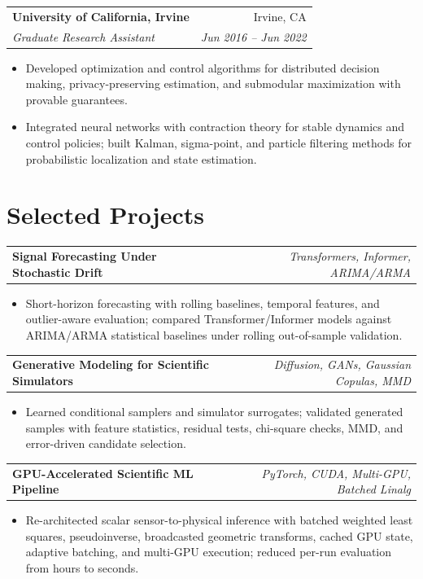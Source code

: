 \documentclass[10pt,letterpaper]{article}
\makeatletter
\newcommand{\resumeSubheading}[4]{
  \vspace{-1pt}
  \begin{tabular*}{\textwidth}[t]{l@{\extracolsep{\fill}}r}
    \textbf{#1} & #2 \\
    \textit{\small #3} & \textit{\small #4} \\
  \end{tabular*}\vspace{-5pt}
}
\newcommand{\resumeProjectHeading}[2]{
  \vspace{-1pt}
  \begin{tabular*}{\textwidth}[t]{l@{\extracolsep{\fill}}r}
    \textbf{\small #1} & \textit{\small #2} \\
  \end{tabular*}\vspace{-5pt}
}
\newcommand{\resumeItem}[1]{\item\small{#1}\vspace{-2pt}}
\makeatother
\begin{document}
\resumeSubheading{University of California, Irvine}{Irvine, CA}{Graduate Research Assistant}{Jun 2016 -- Jun 2022}
\begin{itemize}[leftmargin=0.15in, itemsep=-2pt, parsep=2pt]
  \resumeItem{Developed optimization and control algorithms for distributed decision making, privacy-preserving estimation, and submodular maximization with provable guarantees.}
  \resumeItem{Integrated neural networks with contraction theory for stable dynamics and control policies; built Kalman, sigma-point, and particle filtering methods for probabilistic localization and state estimation.}
\end{itemize}

\section{Selected Projects}
\resumeProjectHeading{Signal Forecasting Under Stochastic Drift}{Transformers, Informer, ARIMA/ARMA}
\begin{itemize}[leftmargin=0.15in, itemsep=-2pt, parsep=2pt]
  \resumeItem{Short-horizon forecasting with rolling baselines, temporal features, and outlier-aware evaluation; compared Transformer/Informer models against ARIMA/ARMA statistical baselines under rolling out-of-sample validation.}
\end{itemize}

\resumeProjectHeading{Generative Modeling for Scientific Simulators}{Diffusion, GANs, Gaussian Copulas, MMD}
\begin{itemize}[leftmargin=0.15in, itemsep=-2pt, parsep=2pt]
  \resumeItem{Learned conditional samplers and simulator surrogates; validated generated samples with feature statistics, residual tests, chi-square checks, MMD, and error-driven candidate selection.}
\end{itemize}

\resumeProjectHeading{GPU-Accelerated Scientific ML Pipeline}{PyTorch, CUDA, Multi-GPU, Batched Linalg}
\begin{itemize}[leftmargin=0.15in, itemsep=-2pt, parsep=2pt]
  \resumeItem{Re-architected scalar sensor-to-physical inference with batched weighted least squares, pseudoinverse, broadcasted geometric transforms, cached GPU state, adaptive batching, and multi-GPU execution; reduced per-run evaluation from hours to seconds.}
\end{itemize}

\end{document}

